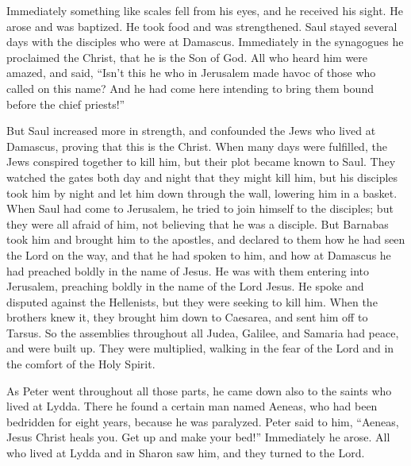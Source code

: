 {Immediately something like scales fell from his eyes, and he received his sight. He arose and was baptized.
He took food and was strengthened. Saul stayed several days with the disciples who were at Damascus.
Immediately in the synagogues he proclaimed the Christ, that he is the Son of God.
All who heard him were amazed, and said, “Isn’t this he who in Jerusalem made havoc of those who called on this name? And he had come here intending to bring them bound before the chief priests!”
\par }{\PP {}But Saul increased more in strength, and confounded the Jews who lived at Damascus, proving that this is the Christ.
When many days were fulfilled, the Jews conspired together to kill him,
but their plot became known to Saul. They watched the gates both day and night that they might kill him,
but his disciples took him by night and let him down through the wall, lowering him in a basket.
When Saul had come to Jerusalem, he tried to join himself to the disciples; but they were all afraid of him, not believing that he was a disciple.
But Barnabas took him and brought him to the apostles, and declared to them how he had seen the Lord on the way, and that he had spoken to him, and how at Damascus he had preached boldly in the name of Jesus.
He was with them entering into Jerusalem,
preaching boldly in the name of the Lord Jesus. He spoke and disputed against the Hellenists, but they were seeking to kill him.
When the brothers knew it, they brought him down to Caesarea, and sent him off to Tarsus.
So the assemblies throughout all Judea, Galilee, and Samaria had peace, and were built up. They were multiplied, walking in the fear of the Lord and in the comfort of the Holy Spirit.
\par }{\PP {}As Peter went throughout all those parts, he came down also to the saints who lived at Lydda.
There he found a certain man named Aeneas, who had been bedridden for eight years, because he was paralyzed.
Peter said to him, “Aeneas, Jesus Christ heals you. Get up and make your bed!” Immediately he arose.
All who lived at Lydda and in Sharon saw him, and they turned to the Lord.
}

